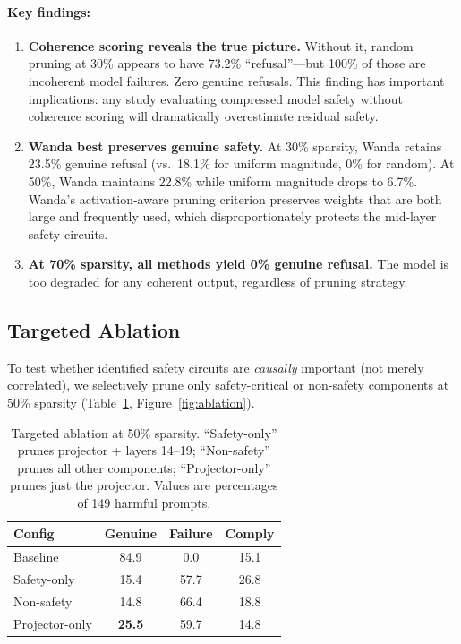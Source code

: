 \documentclass[11pt]{article}
\begin{document}
\paragraph{Key findings:}
\begin{enumerate}
    \item \textbf{Coherence scoring reveals the true picture.} Without it, random pruning at 30\% appears to have 73.2\% ``refusal''---but 100\% of those are incoherent model failures. Zero genuine refusals. This finding has important implications: any study evaluating compressed model safety without coherence scoring will dramatically overestimate residual safety.

    \item \textbf{Wanda best preserves genuine safety.} At 30\% sparsity, Wanda retains 23.5\% genuine refusal (vs.\ 18.1\% for uniform magnitude, 0\% for random). At 50\%, Wanda maintains 22.8\% while uniform magnitude drops to 6.7\%. Wanda's activation-aware pruning criterion preserves weights that are both large and frequently used, which disproportionately protects the mid-layer safety circuits.

    \item \textbf{At 70\% sparsity, all methods yield 0\% genuine refusal.} The model is too degraded for any coherent output, regardless of pruning strategy.
\end{enumerate}

\subsection{Targeted Ablation}

To test whether identified safety circuits are \emph{causally} important (not merely correlated), we selectively prune only safety-critical or non-safety components at 50\% sparsity (Table~\ref{tab:ablation}, Figure~\ref{fig:ablation}).

\begin{table}[t]
\centering
\small
\begin{tabular}{@{}lccc@{}}
\toprule
\textbf{Config} & \textbf{Genuine} & \textbf{Failure} & \textbf{Comply} \\
\midrule
Baseline & 84.9 & 0.0 & 15.1 \\
Safety-only & 15.4 & 57.7 & 26.8 \\
Non-safety & 14.8 & 66.4 & 18.8 \\
Projector-only & \textbf{25.5} & 59.7 & 14.8 \\
\bottomrule
\end{tabular}
\caption{Targeted ablation at 50\% sparsity. ``Safety-only'' prunes projector + layers 14--19; ``Non-safety'' prunes all other components; ``Projector-only'' prunes just the projector. Values are percentages of 149 harmful prompts.}
\label{tab:ablation}
\end{table}
\end{document}
